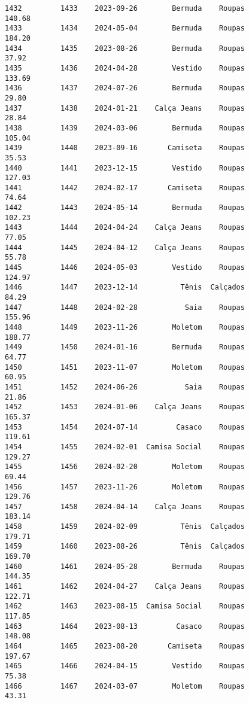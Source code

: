 \documentclass[11pt]{article}
\begin{document}
\begin{Verbatim}[commandchars=\\\{\}]
1432         1433    2023-09-26        Bermuda    Roupas          140.68   
1433         1434    2024-05-04        Bermuda    Roupas          184.20   
1434         1435    2023-08-26        Bermuda    Roupas           37.92   
1435         1436    2024-04-28        Vestido    Roupas          133.69   
1436         1437    2024-07-26        Bermuda    Roupas           29.80   
1437         1438    2024-01-21    Calça Jeans    Roupas           28.84   
1438         1439    2024-03-06        Bermuda    Roupas          105.04   
1439         1440    2023-09-16       Camiseta    Roupas           35.53   
1440         1441    2023-12-15        Vestido    Roupas          127.03   
1441         1442    2024-02-17       Camiseta    Roupas           74.64   
1442         1443    2024-05-14        Bermuda    Roupas          102.23   
1443         1444    2024-04-24    Calça Jeans    Roupas           77.05   
1444         1445    2024-04-12    Calça Jeans    Roupas           55.78   
1445         1446    2024-05-03        Vestido    Roupas          124.97   
1446         1447    2023-12-14          Tênis  Calçados           84.29   
1447         1448    2024-02-28           Saia    Roupas          155.96   
1448         1449    2023-11-26        Moletom    Roupas          188.77   
1449         1450    2024-01-16        Bermuda    Roupas           64.77   
1450         1451    2023-11-07        Moletom    Roupas           60.95   
1451         1452    2024-06-26           Saia    Roupas           21.86   
1452         1453    2024-01-06    Calça Jeans    Roupas          165.37   
1453         1454    2024-07-14         Casaco    Roupas          119.61   
1454         1455    2024-02-01  Camisa Social    Roupas          129.27   
1455         1456    2024-02-20        Moletom    Roupas           69.44   
1456         1457    2023-11-26        Moletom    Roupas          129.76   
1457         1458    2024-04-14    Calça Jeans    Roupas          183.14   
1458         1459    2024-02-09          Tênis  Calçados          179.71   
1459         1460    2023-08-26          Tênis  Calçados          169.70   
1460         1461    2024-05-28        Bermuda    Roupas          144.35   
1461         1462    2024-04-27    Calça Jeans    Roupas          122.71   
1462         1463    2023-08-15  Camisa Social    Roupas          117.85   
1463         1464    2023-08-13         Casaco    Roupas          148.08   
1464         1465    2023-08-20       Camiseta    Roupas          197.67   
1465         1466    2024-04-15        Vestido    Roupas           75.38   
1466         1467    2024-03-07        Moletom    Roupas           43.31   

\end{Verbatim}
\end{document}
